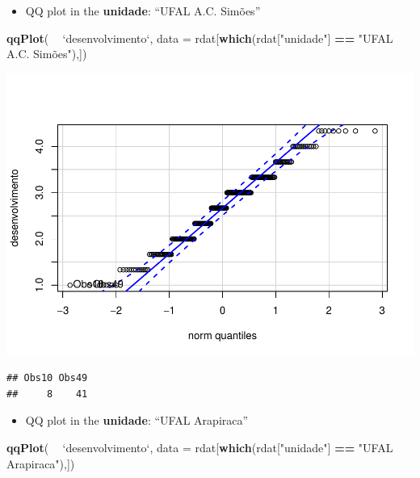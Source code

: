 \documentclass[]{article}
\newenvironment{Shaded}{\begin{snugshade}}{\end{snugshade}}
\newcommand{\DataTypeTok}[1]{\textcolor[rgb]{0.13,0.29,0.53}{#1}}
\newcommand{\KeywordTok}[1]{\textcolor[rgb]{0.13,0.29,0.53}{\textbf{#1}}}
\newcommand{\NormalTok}[1]{#1}
\newcommand{\OperatorTok}[1]{\textcolor[rgb]{0.81,0.36,0.00}{\textbf{#1}}}
\newcommand{\StringTok}[1]{\textcolor[rgb]{0.31,0.60,0.02}{#1}}
\providecommand{\tightlist}{%
  \setlength{\itemsep}{0pt}\setlength{\parskip}{0pt}}
\begin{document}
\begin{itemize}
\tightlist
\item
  QQ plot in the \textbf{unidade}: ``UFAL A.C. Simões''
\end{itemize}

\begin{Shaded}
\begin{Highlighting}[]
\KeywordTok{qqPlot}\NormalTok{( }\OperatorTok{~}\StringTok{ `}\DataTypeTok{desenvolvimento}\StringTok{`}\NormalTok{, }\DataTypeTok{data =}\NormalTok{ rdat[}\KeywordTok{which}\NormalTok{(rdat[}\StringTok{"unidade"}\NormalTok{] }\OperatorTok{==}\StringTok{ "UFAL A.C. Simões"),])}
\end{Highlighting}
\end{Shaded}

\includegraphics{factorialAnova_files/figure-latex/unnamed-chunk-9-1.pdf}

\begin{verbatim}
## Obs10 Obs49 
##     8    41
\end{verbatim}

\begin{itemize}
\tightlist
\item
  QQ plot in the \textbf{unidade}: ``UFAL Arapiraca''
\end{itemize}

\begin{Shaded}
\begin{Highlighting}[]
\KeywordTok{qqPlot}\NormalTok{( }\OperatorTok{~}\StringTok{ `}\DataTypeTok{desenvolvimento}\StringTok{`}\NormalTok{, }\DataTypeTok{data =}\NormalTok{ rdat[}\KeywordTok{which}\NormalTok{(rdat[}\StringTok{"unidade"}\NormalTok{] }\OperatorTok{==}\StringTok{ "UFAL Arapiraca"}\NormalTok{),])}
\end{Highlighting}
\end{Shaded}
\end{document}

